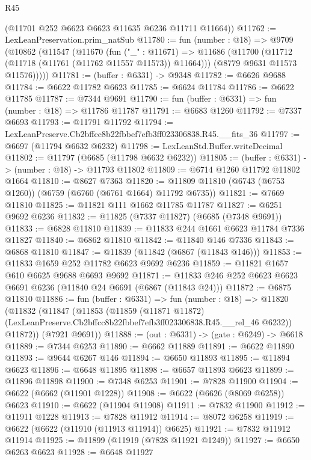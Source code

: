 \begin{lexlean}{R45}
\begin{coremodule}
{      (@11701 @252 @6623 @6623 @11635 @6236 @11711 @11664))
@11762 := LexLeanPreservation.prim_natSub
@11780 := fun (number : @18) =>
  @9709
    (@10862
      (@11547
        (@11670
          (fun ("_" : @11671) =>
          @11686
            (@11700 (@11712 (@11718 (@11761 (@11762 @11557 @11573)) @11664)))
            (@8779 @9631 @11573 @11576)))))
@11781 := (buffer : @6331) -> @9348
@11782 := @6626 @9688
@11784 := @6622 @11782 @6623
@11785 := @6624 @11784
@11786 := @6622 @11785
@11787 := @7344 @9691
@11790 := fun (buffer : @6331) => fun (number : @18) => @11786 @11787
@11791 := @6683 @1260
@11792 := @7337 @6693
@11793 := @11791 @11792
@11794 := LexLeanPreserve.Cb2bffcc8b22fbbef7efb3ff023306838.R45.__fits_36
@11797 := @6697 (@11794 @6632 @6232)
@11798 := LexLeanStd.Buffer.writeDecimal
@11802 := @11797 (@6685 (@11798 @6632 @6232))
@11805 := (buffer : @6331) -> (number : @18) -> @11793 @11802
@11809 := @6714 @1260 @11792 @11802 @1664
@11810 := @8627 @7363
@11820 := @11809 @11810 (@6743 (@6753 @1260)) (@6759 (@6760 (@6761 @1664) @11792 @6735))
@11821 := @7669 @11810
@11825 := @11821 @111 @1662 @11785 @11787
@11827 := @6251 @9692 @6236
@11832 := @11825 (@7337 @11827) (@6685 (@7348 @9691))
@11833 := @6828 @11810
@11839 := @11833 @244 @1661 @6623 @11784 @7336 @11827
@11840 := @6862 @11810
@11842 := @11840 @146 @7336
@11843 := @6868 @11810
@11847 := @11839 (@11842 (@6867 (@11843 @146)))
@11853 := @11833 @1659 @252 @11782 @6623 @9692 @6236
@11859 := @11821 @1657 @610 @6625 @9688 @6693 @9692
@11871 := @11833 @246 @252 @6623 @6623 @6691 @6236 (@11840 @24 @6691 (@6867 (@11843 @24)))
@11872 := @6875 @11810
@11886 := fun (buffer : @6331) =>
  fun (number : @18) =>
  @11820
    (@11832
      (@11847
        (@11853
          (@11859
            (@11871 @11872)
            (LexLeanPreserve.Cb2bffcc8b22fbbef7efb3ff023306838.R45.__rel_46 @6232))
          @11872))
      (@7921 @9691))
@11888 := (out : @6331) -> (gate : @6249) -> @6618
@11889 := @7344 @6253
@11890 := @6662 @11889
@11891 := @6622 @11890
@11893 := @9644 @6267 @146
@11894 := @6650 @11893
@11895 := @11894 @6623
@11896 := @6648 @11895
@11898 := @6657 @11893 @6623
@11899 := @11896 @11898
@11900 := @7348 @6253
@11901 := @7828 @11900
@11904 := @6622 (@6662 (@11901 @1228))
@11908 := @6622 (@6626 (@8069 @6258)) @6623
@11910 := @6622 (@11904 @11908)
@11911 := @7832 @11900
@11912 := @11911 @1228
@11913 := @7828 @11912
@11914 := @8072 @6258
@11919 := @6622 (@6622 (@11910 (@11913 @11914)) @6625)
@11921 := @7832 @11912 @11914
@11925 := @11899 (@11919 (@7828 @11921 @1249))
@11927 := @6650 @6263 @6623
@11928 := @6648 @11927
}
\end{coremodule}
\end{lexlean}
